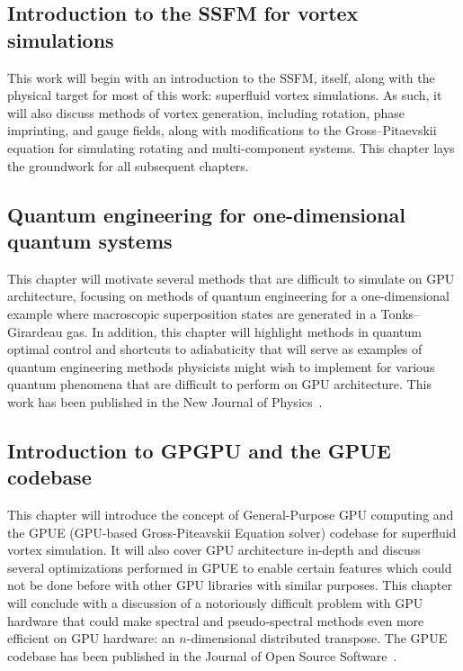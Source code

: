 \subsection*{Introduction to the SSFM for vortex simulations}

This work will begin with an introduction to the SSFM, itself, along with the physical target for most of this work: superfluid vortex simulations.
As such, it will also discuss methods of vortex generation, including rotation, phase imprinting, and gauge fields, along with modifications to the Gross--Pitaevskii equation for simulating rotating and multi-component systems.
This chapter lays the groundwork for all subsequent chapters.

\subsection*{Quantum engineering for one-dimensional quantum systems}

This chapter will motivate several methods that are difficult to simulate on GPU architecture, focusing on methods of quantum engineering for a one-dimensional example where macroscopic superposition states are generated in a Tonks--Girardeau gas.
In addition, this chapter will highlight methods in quantum optimal control and shortcuts to adiabaticity that will serve as examples of quantum engineering methods physicists might wish to implement for various quantum phenomena that are difficult to perform on GPU architecture.
This work has been published in the New Journal of Physics~\cite{schloss2016}.


\subsection*{Introduction to GPGPU and the GPUE codebase}

This chapter will introduce the concept of General-Purpose GPU computing and the GPUE (GPU-based Gross-Piteavskii Equation solver) codebase for superfluid vortex simulation.
It will also cover GPU architecture in-depth and discuss several optimizations performed in GPUE to enable certain features which could not be done before with other GPU libraries with similar purposes.
This chapter will conclude with a discussion of a notoriously difficult problem with GPU hardware that could make spectral and pseudo-spectral methods even more efficient on GPU hardware: an $n$-dimensional distributed transpose.
The GPUE codebase has been published in the Journal of Open Source Software~\cite{schloss2018}.

